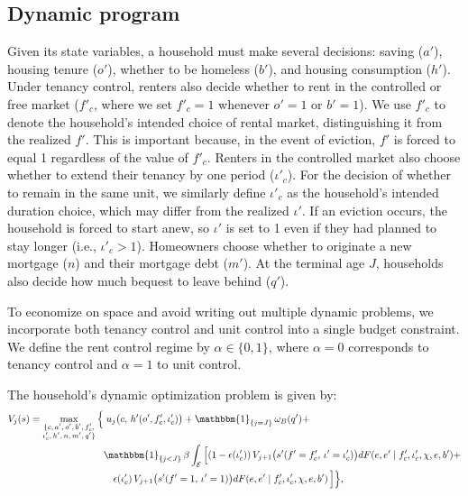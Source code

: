 \documentclass[parskip=full]{article}
\begin{document}
\subsection{Dynamic program}\label{subsection:household_optimization}
Given its state variables, a household must make several decisions: saving ($a'$), housing tenure ($o'$), whether to be homeless ($b'$), and housing consumption ($h'$). Under tenancy control, renters also decide whether to rent in the controlled or free market ($f'_{c}$, where we set $f'_{c}=1$ whenever $o'=1$ or $b'=1$). We use $f'_c$ to denote the household's intended choice of rental market, distinguishing it from the realized $f'$. This is important because, in the event of eviction, $f'$ is forced to equal 1 regardless of the value of $f'_c$.
Renters in the controlled market also choose whether to extend their tenancy by one period ($\iota'_c$). For the decision of whether to remain in the same unit, we similarly define $\iota'_c$ as the household's intended duration choice, which may differ from the realized $\iota'$. If an eviction occurs, the household is forced to start anew, so $\iota'$ is set to 1 even if they had planned to stay longer (i.e., $\iota'_c > 1$). Homeowners choose whether to originate a new mortgage ($n$) and their mortgage debt ($m'$). At the terminal age $J$, households also decide how much bequest to leave behind ($q'$).

To economize on space and avoid writing out multiple dynamic problems, we incorporate both tenancy control and unit control into a single budget constraint. We define the rent control regime by $\alpha \in \{0,1\}$, where $\alpha=0$ corresponds to tenancy control and $\alpha=1$ to unit control.

The household's dynamic optimization problem is given by:
\begin{equation}\label{eq:vf}
\begin{aligned}
V_{j}(s) 
= \max_{\substack{\{c,\, a',\, o',\, b',\, f'_c, \\ \iota'_c,\, h',\, n,\, m',\, q'\}}} \Big\{
& \; u_{j}\big( c,\, h'( o', f'_c, \iota'_c ) \big)
+ \mathbbm{1}_{\{ j = J \}}\, \omega_{B}(q')+ \\
& \mathbbm{1}_{\{ j < J \}}\, \beta 
\int_{\mathcal{E}} \Big[
(1 - \epsilon(\iota'_c))\, V_{j+1}\big( s'( f' = f'_c,\, \iota' = \iota'_c ) \big)dF(e, e' \mid f'_c, \iota'_c, \chi, e, b') +\\ & \quad \epsilon(\iota'_c)\, V_{j+1}\big( s'( f' = 1,\, \iota' = 1 ) \big)dF(e, e' \mid f'_c, \iota'_c, \chi, e, b') \,  \Big]
\Big\},
\end{aligned}
\end{equation}
\end{document}
